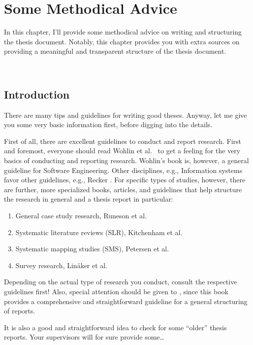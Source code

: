 
\chapter{Some Methodical Advice}
\label{chp:MethodicalAdvice}
In this chapter, I'll provide some methodical advice on writing and structuring the thesis document. Notably, this chapter provides you with extra sources on providing a meaningful and transparent structure of the thesis document.

~\\
\vfill
\minitoc
\clearpage


\section{Introduction}
\label{sec:03:Intro}
There are many tips and guidelines for writing good theses. Anyway, let me give you some very basic information first, before digging into the details.

First of all, there are excellent guidelines to conduct and report research. First and foremost, everyone should read Wohlin et al.~\cite{wohlin2012experimentation} to get a feeling for the very basics of conducting and reporting research. Wohlin's book is, however, a general guideline for Software Engineering. Other disciplines, e.g., Information systems favor other guidelines, e.g., Recker \cite{Recker2021}. For specific types of studies, however, there are further, more specialized books, articles, and guidelines that help structure the research in general and a thesis report in particular:
\begin{enumerate}
	\item General case study research, Runeson et al.~\cite{Runeson:2012aa,runeson09}
	\item Systematic literature reviews (SLR), Kitchenham et al.~\cite{Kitchenham:2015rt,Kitchenham:2004fk}
	\item Systematic mapping studies (SMS), Petersen et al.~\cite{PVK15}
	\item Survey research, Lin\r{a}ker et al.~\cite{Linaker:2015aa}
\end{enumerate}
Depending on the actual type of research you conduct, consult the respective guidelines first! Also, special attention should be given to \cite{Runeson:2012aa}, since this book provides a comprehensive and straightforward guideline for a general structuring of reports.

\begin{MySugg}
	It is also a good and straightforward idea to check for some ``older'' thesis reports. Your supervisors will for sure provide some\ldots
\end{MySugg}

